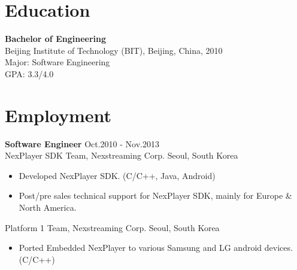 \documentclass[margin]{res}
\begin{document}

\address{  Email: kimcherwoo@gmail.com\\Mobile: (+82)010-8301-0173}
\address{  Room 204 \\ 501-28 Silimdong Gwanak-gu \\Seoul, South Korea.\\Postcode: 135-080 }


\begin{resume}
 

\section{Education} {\bf Bachelor of Engineering  } \\
                Beijing Institute of Technology (BIT), Beijing, China,  2010 	\\
                Major: Software Engineering \\
                GPA: 3.3/4.0
 
\section{Employment} 
				{ \bf Software Engineer  } \hfill Oct.2010 - Nov.2013 \\                
				NexPlayer SDK Team, Nexstreaming Corp. Seoul, South Korea
                \begin{itemize}  \itemsep -2pt %
                \item   Developed NexPlayer SDK. (C/C++, Java, Android)
				\item   Post/pre sales technical support for NexPlayer SDK, mainly for Europe \& North America.
                \end{itemize}
				
				Platform 1 Team, Nexstreaming Corp. Seoul, South Korea
				\begin{itemize}  \itemsep -2pt %
				\item Ported Embedded NexPlayer to various Samsung and LG android devices.(C/C++)
				\end{itemize}
				

\end{resume}
\end{document}
